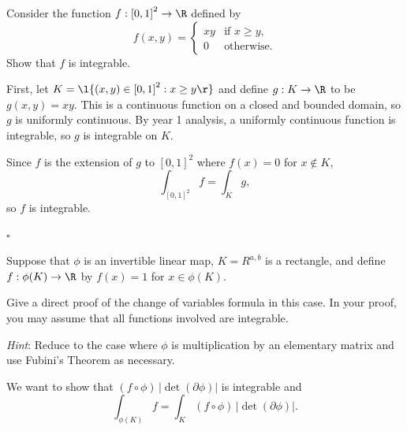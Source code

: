 \documentclass[a4paper]{article}
\begin{document}


\begin{questionbody}
Consider the function $f : {[0, 1]}^2 \to \R$ defined by \[
f(x, y) = \begin{cases}
xy & \text{if } x \ge y, \\
0 & \text{otherwise}.
\end{cases}
\] Show that $f$ is integrable.
\end{questionbody}

First, let $K = \l\{(x, y) \in {[0, 1]}^2 : x \ge y\r\}$ and define $g : K \to \R$ to be $g(x, y) = xy$. This is a continuous function on a closed and bounded domain, so $g$ is uniformly continuous. By year 1 analysis, a uniformly continuous function is integrable, so $g$ is integrable on $K$.

Since $f$ is the extension of $g$ to ${[0, 1]}^2$ where $f(x) = 0$ for $x \notin K$, \[
\int_{{[0, 1]}^2} f = \int_K g,
\] so $f$ is integrable.

\hfill $\square$



\begin{questionbody}
Suppose that $\phi$ is an invertible linear map, $K = R^{a, b}$ is a rectangle, and define $f : \phi(K) \to \R$ by $f(x) = 1$ for $x \in \phi(K)$.

Give a direct proof of the change of variables formula in this case. In your proof, you may assume that all functions involved are integrable.

\textit{Hint}: Reduce to the case where $\phi$ is multiplication by an elementary matrix and use Fubini's Theorem as necessary.
\end{questionbody}

We want to show that $(f \circ \phi) \, |\det(\partial \phi)|$ is integrable and \[
\int_{\phi(K)} f = \int_K (f \circ \phi) \, |\det(\partial \phi)|.
\]

\end{document}
